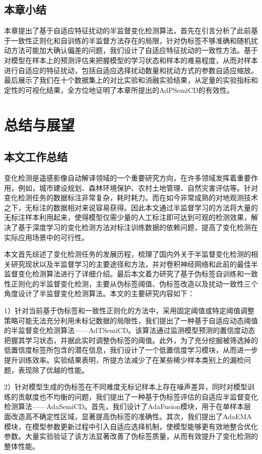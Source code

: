 \documentclass[lang=chs, degree=master, blindreview=false, adobe=false]{yanputhesis}
\begin{document}
\section{本章小结}
本章提出了基于自适应特征扰动的半监督变化检测算法，首先在引言分析了此前基于一致性正则化和自训练的半监督方法存在的局限，针对伪标签不够准确和随机扰动方法可能加大确认偏差的问题，我们设计了自适应特征扰动的一致性方法。基于对模型在样本上的预测评估来把握模型的学习状态和样本的难易程度，从而对样本进行自适应的特征扰动，包括自适应选择扰动数量和扰动方式的参数自适应缩放。最后展示了我们在十个数据集上的对比实验和消融实验结果，从定量的实验指标和定性的可视化结果，全方位地证明了本章所提出的AdPSemiCD的有效性。
\cleardoublepage
\chapter{总结与展望}
\section{本文工作总结}
变化检测是遥感影像自动解译领域的一个重要研究方向，在许多领域发挥着重要作用，例如，城市建设规划、森林环境保护、农村土地管理、自然灾害评估等。针对变化检测任务的数据标注非常复杂，耗时耗力。而在如今非常成熟的对地观测技术之下，无标注的数据相对来说容易获得。因此本文通过半监督学习的方法将大量的无标注样本利用起来，使得模型仅需少量的人工标注即可达到可观的检测效果，解决了基于深度学习的变化检测方法对标注训练数据的依赖问题，提高了变化检测在实际应用场景中的可行性。

本文首先综述了变化检测任务的发展历程，梳理了国内外关于半监督变化检测的相关研究现状以及半监督学习的主要途径和方法，并对卷积神经网络和此前的最佳半监督变化检测算法进行了详细介绍。最后本文着力研究了基于伪标签自训练和一致性正则化的半监督变化检测，主要从伪标签阈值、伪标签改造以及扰动一致性三个角度设计了半监督变化检测算法。本文的主要研究内容如下：

    1）针对当前基于伪标签和一致性正则化的方法中，采用固定阈值或特定阈值调整策略可能无法充分利用未标记数据的局限性，我们提出了一种基于自适应动态阈值的半监督变化检测算法——AdTSemiCD。该算法通过监测模型预测的置信度动态把握其学习状态，并据此实时调整伪标签的阈值。此外，为了充分挖掘被筛选掉的低置信度标签所包含的潜在信息，我们设计了一个低置信度学习模块，从而进一步提升训练效率。实验结果表明，所提方法减少了在某些稀少样本类别上的漏检问题，表现除了优越的性能。

    2）针对模型生成的伪标签在不同难度无标记样本上存在噪声差异，同时对模型训练的贡献度也不均衡的问题，我们提出了一种基于伪标签评估的自适应半监督变化检测算法——AdaSemiCD。首先，我们设计了AdaFusion模块，用于在单样本层面改造高不确定性区域，显著提高伪标签的准确性。其次，我们提出了AdaEMA模块，在模型参数更新过程中引入自适应选择机制，使模型能够更有效地整合优化参数。大量实验验证了该方法显著改善了伪标签质量，从而有效提升了变化检测的整体性能。
\end{document}
